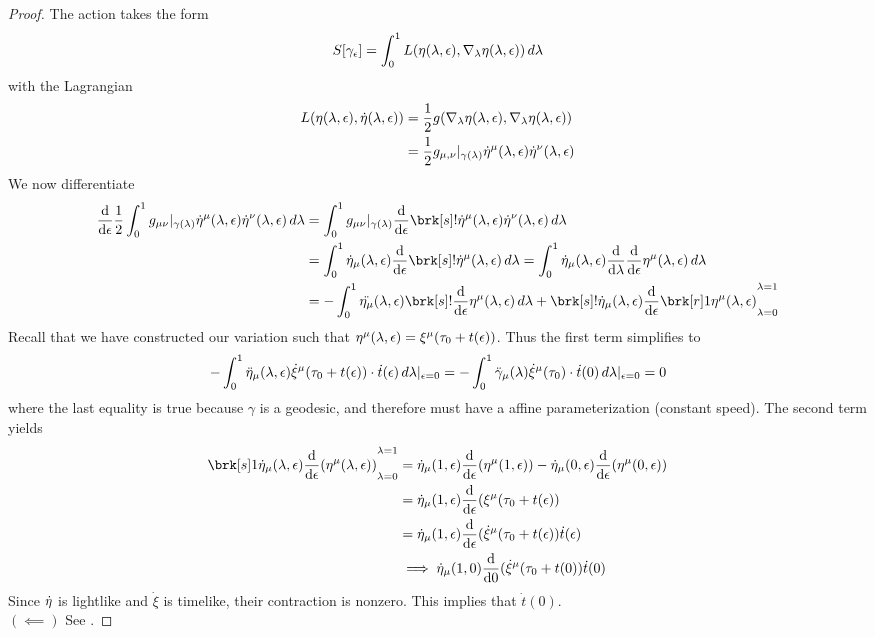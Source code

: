 \begin{proof}
The action takes the form
\begin{equation}\label{}
S[\gamma_{\epsilon}] = \int_0^1 L(\eta(\lambda, \epsilon), \nabla_{\lambda} \eta(\lambda, \epsilon)) \, d\lambda
\end{equation}
with the Lagrangian
\begin{align*}
L(\eta(\lambda, \epsilon), \dot{\eta}(\lambda, \epsilon)) &= \frac{1}{2} g (\nabla_{\lambda} \eta(\lambda, \epsilon), \nabla_{\lambda} \eta(\lambda, \epsilon)) \\
&= \frac{1}{2} g_{\mu, \nu} \rvert_{\gamma(\lambda)} \dot{\eta}^{\mu} (\lambda, \epsilon) \dot{\eta}^{\nu}(\lambda, \epsilon)
\end{align*}
%
We now differentiate
\begin{align*}
\diff{}{\eps} \frac{1}{2} \int_0^1 g_{\mu \nu} \at_{\gamma(\lam)} \veta^{\mu}(\lam, \eps) \veta^{\nu}(\lam, \eps) \, d\lam
&= \int_0^1 g_{\mu \nu} \at_{\gamma(\lam)} \diff{}{\eps}\brk[s]!{\veta^{\mu}(\lam, \eps)} \veta^{\nu}(\lam, \eps) \, d\lam \\
&= \int_0^1 \veta_{\mu} (\lam, \eps) \diff{}{\eps} \brk[s]!{\veta^{\mu} (\lam, \eps)} \, d\lam
= \int_0^1 \veta_{\mu} (\lam, \eps) \diff{}{\lam} \diff{}{\eps} \eta^{\mu} (\lam, \eps) \, d\lam\\
&= - \int_0^1 \ddot{\eta_{\mu}}(\lam, \eps) \brk[s]!{\diff{}{\eps} \eta^{\mu}(\lam, \eps)} \, d\lam + \brk[s]!{\veta_{\mu} (\lam, \eps) \diff{}{\eps} \brk[r]1{\eta^{\mu}(\lam, \eps)}}^{\lam = 1}_{\lam=0}
\end{align*}
Recall that we have constructed our variation such that $\eta^{\mu}(\lambda, \epsilon) = \xi^{\mu}(\tau_0 + t(\epsilon))$. Thus the first term simplifies to
\begin{equation}\label{}
-\int_0^1 \ddot{\eta}_{\mu}(\lambda, \epsilon) \dot{\xi}^{\mu}(\tau_0 + t(\epsilon)) \cdot \dot{t}(\epsilon) \, d\lambda \rvert_{\epsilon=0} =
-\int_0^1 \ddot{\gamma}_{\mu}(\lambda) \dot{\xi}^{\mu}(\tau_0) \cdot \dot{t}(0) \, d\lambda \rvert_{\epsilon=0} = 0
\end{equation}
where the last equality is true because $\gamma$ is a geodesic, and therefore must have a affine parameterization (constant speed). The second term yields
\begin{align*}
\brk[s]1{\veta_{\mu} (\lam, \eps) \diff{}{\eps} (\eta^{\mu}(\lam, \eps))}^{\lam = 1}_{\lam = 0}
&= \veta_{\mu} (1, \eps) \diff{}{\eps} (\eta^{\mu}(1, \eps))
-  \veta_{\mu} (0, \eps) \diff{}{\eps} (\eta^{\mu}(0, \eps)) \\
&=\veta_{\mu} (1, \eps) \diff{}{\eps} (\xi^{\mu}(\tau_0 + t(\eps)) \\
&=\veta_{\mu} (1, \eps) \diff{}{\eps} (\dot{\xi}^{\mu}(\tau_0 + t(\eps)) \dot{t}(\eps) \\
&\implies \veta_{\mu} (1, 0) \diff{}{0} (\dot{\xi}^{\mu}(\tau_0 + t(0)) \dot{t}(0)
\end{align*}
Since $\dot{\eta}$ is lightlike and $\dot{\xi}$ is timelike, their contraction is nonzero. This implies that $\dot{t}(0)$.
%
\\$(\impliedby)$ See \cite{1992grle.book.....S}.
\end{proof}
%

